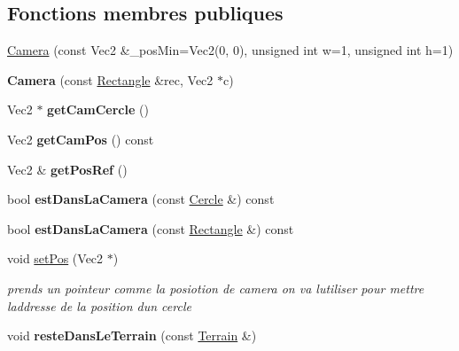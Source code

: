 \subsection*{Fonctions membres publiques}
\begin{DoxyCompactItemize}
\item 
\mbox{\hyperlink{class_camera_ab01f0ff58d8ebd0ffbe27f62a9a9e3ac}{Camera}} (const Vec2 \&\+\_\+pos\+Min=Vec2(0, 0), unsigned int w=1, unsigned int h=1)
\item 
\mbox{\label{class_camera_a9afa00681d1ad6e1c27e1a57f2f9fa3b}} 
{\bfseries Camera} (const \mbox{\hyperlink{class_rectangle}{Rectangle}} \&rec, Vec2 $\ast$c)
\item 
\mbox{\label{class_camera_a6bc12c73b564c99186eb085e23ba733c}} 
Vec2 $\ast$ {\bfseries get\+Cam\+Cercle} ()
\item 
\mbox{\label{class_camera_a6f7f884d3b0765cdbbce3edce865f15f}} 
Vec2 {\bfseries get\+Cam\+Pos} () const
\item 
\mbox{\label{class_camera_a23e1db806a30ed408267108b30b030f4}} 
Vec2 \& {\bfseries get\+Pos\+Ref} ()
\item 
\mbox{\label{class_camera_a5d2e17beaf1533caf8726b576c32ec94}} 
bool {\bfseries est\+Dans\+La\+Camera} (const \mbox{\hyperlink{class_cercle}{Cercle}} \&) const
\item 
\mbox{\label{class_camera_a2ee4df62243f38013fdfbb5aa08282d7}} 
bool {\bfseries est\+Dans\+La\+Camera} (const \mbox{\hyperlink{class_rectangle}{Rectangle}} \&) const
\item 
\mbox{\label{class_camera_a8f888f5b620bd332c88bd49dfaaa1574}} 
void \mbox{\hyperlink{class_camera_a8f888f5b620bd332c88bd49dfaaa1574}{set\+Pos}} (Vec2 $\ast$)
\begin{DoxyCompactList}\small\item\em prends un pointeur comme la posiotion de camera on va l\textquotesingle{}utiliser pour mettre l\textquotesingle{}addresse de la position d\textquotesingle{}un cercle \end{DoxyCompactList}\item 
\mbox{\label{class_camera_a2c0a2712a6f8cbe29a9f4ede68bf828f}} 
void {\bfseries reste\+Dans\+Le\+Terrain} (const \mbox{\hyperlink{class_terrain}{Terrain}} \&)
\end{DoxyCompactItemize}
